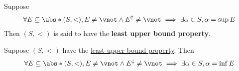 \bigskip

\begin{definition} \label{an:def:least-upper-bound-property}
  Suppose
  \[
    \forall E \subseteq \abs*{(S, <)}, E \neq \vnot \land E^{\uparrow} \neq \vnot \implies \exists \alpha \in S, \alpha = \sup E
  \]
  Then $(S, <)$ is said to have the \textbf{least upper bound property}.
\end{definition}

\bigskip

\begin{theorem} \label{an:thm:greatest-lower-bound-property}
  Suppose $(S, <)$ have the \hyperref[an:def:least-upper-bound-property]{least upper bound property}. Then
  \[
    \forall E \subseteq \abs*{(S, <)}, E \neq \vnot \land E^{\downarrow} \neq \vnot \implies \exists \alpha \in S, \alpha = \inf E
  \]
\end{theorem}

